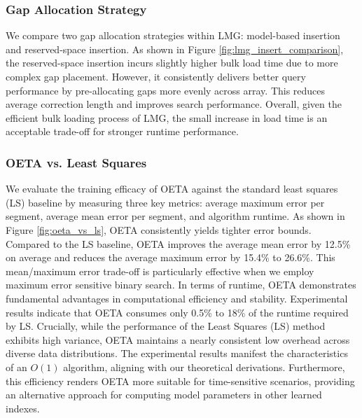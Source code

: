 \subsubsection{Gap Allocation Strategy}
We compare two gap allocation strategies within LMG: model-based insertion \cite{alex20} and reserved-space insertion. As shown in Figure \ref{fig:lmg_insert_comparison}, the reserved-space insertion incurs slightly higher bulk load time due to more complex gap placement. However, it consistently delivers better query performance by pre-allocating gaps more evenly across array. This reduces average correction length and improves search performance. Overall, given the efficient bulk loading process of LMG, the small increase in load time is an acceptable trade-off for stronger runtime performance.

\subsubsection{OETA vs. Least Squares} 
\label{sec:oeta_vs_ls}

We evaluate the training efficacy of OETA against the standard least squares (LS) baseline by measuring three key metrics: average maximum error per segment, average mean error per segment, and algorithm runtime. As shown in Figure \ref{fig:oeta_vs_ls}, OETA consistently yields tighter error bounds. Compared to the LS baseline, OETA improves the average mean error by 12.5\% on average and reduces the average maximum error by 15.4\% to 26.6\%. This mean/maximum error trade-off is particularly effective when we employ maximum error sensitive binary search. In terms of runtime, OETA demonstrates fundamental advantages in computational efficiency and stability. Experimental results indicate that OETA consumes only 0.5\% to 18\% of the runtime required by LS. Crucially, while the performance of the Least Squares (LS) method exhibits high variance, OETA maintains a nearly consistent low overhead across diverse data distributions. The experimental results manifest the characteristics of an $O(1)$ algorithm, aligning with our theoretical derivations. Furthermore, this efficiency renders OETA more suitable for time-sensitive scenarios, providing an alternative approach for computing model parameters in other learned indexes.

